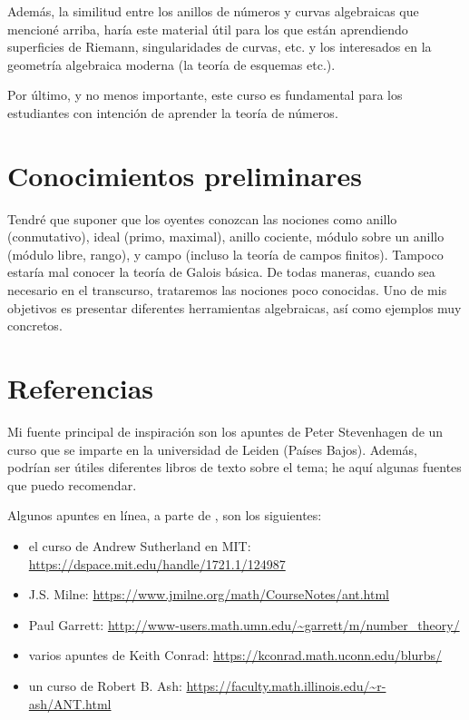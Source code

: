Además, la similitud entre los anillos de números y curvas algebraicas que
mencioné arriba, haría este material útil para los que están aprendiendo
superficies de Riemann, singularidades de curvas, etc. y los interesados
en la geometría algebraica moderna (la teoría de esquemas etc.).

Por último, y no menos importante, este curso es fundamental para los
estudiantes con intención de aprender la teoría de números.

\section{Conocimientos preliminares}

Tendré que suponer que los oyentes conozcan las nociones como anillo
(conmutativo), ideal (primo, maximal), anillo cociente, módulo sobre un anillo
(módulo libre, rango), y campo (incluso la teoría de campos finitos).
Tampoco estaría mal conocer la teoría de Galois básica. De todas maneras,
cuando sea necesario en el transcurso, trataremos las nociones poco
conocidas. Uno de mis objetivos es presentar diferentes herramientas
algebraicas, así como ejemplos muy concretos.

\section{Referencias}

Mi fuente principal de inspiración son los apuntes de
Peter Stevenhagen \cite{Stevenhagen-NR} de un curso que se imparte en
la universidad de Leiden (Países Bajos). Además, podrían ser útiles diferentes
libros de texto sobre el tema; he aquí algunas fuentes que puedo recomendar.

Algunos apuntes en línea, a parte de \cite{Stevenhagen-NR}, son los siguientes:
\begin{itemize}
\item el curso de Andrew Sutherland en MIT:
  \url{https://dspace.mit.edu/handle/1721.1/124987}

\item J.S. Milne: 
  \url{https://www.jmilne.org/math/CourseNotes/ant.html}

\item Paul Garrett:
  \url{http://www-users.math.umn.edu/~garrett/m/number_theory/}

\item varios apuntes de Keith Conrad:
  \url{https://kconrad.math.uconn.edu/blurbs/}

\item un curso de Robert B. Ash:
  \url{https://faculty.math.illinois.edu/~r-ash/ANT.html}
\end{itemize}

